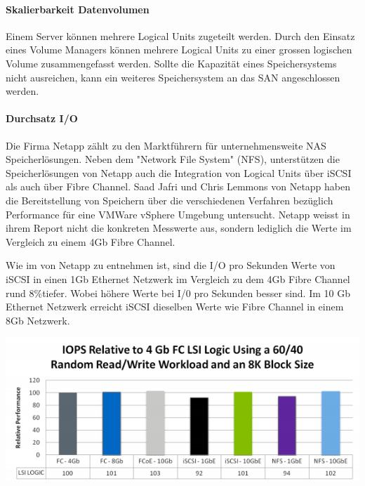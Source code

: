 \paragraph*{Skalierbarkeit Datenvolumen}
Einem Server können mehrere Logical Units zugeteilt werden. Durch den Einsatz eines Volume Managers können mehrere Logical Units zu einer grossen logischen Volume zusammengefasst werden. Sollte die Kapazität eines Speichersystems nicht ausreichen, kann ein weiteres Speichersystem an das SAN angeschlossen werden.

\paragraph*{Durchsatz I/O}
Die Firma Netapp zählt zu den Marktführern für unternehmensweite NAS Speicherlösungen. Neben dem "Network File System" (NFS), unterstützen die Speicherlösungen von Netapp auch die Integration von Logical Units über iSCSI als auch über Fibre Channel. Saad Jafri und Chris Lemmons von Netapp haben die Bereitstellung von Speichern über die verschiedenen Verfahren bezüglich Performance für eine VMWare vSphere Umgebung untersucht. Netapp weisst in ihrem Report nicht die konkreten Messwerte aus, sondern lediglich die Werte im Vergleich zu einem 4Gb Fibre Channel.

Wie im  von Netapp zu entnehmen ist, sind die I/O pro Sekunden Werte von iSCSI in einen 1Gb Ethernet Netzwerk im Vergleich zu dem 4Gb Fibre Channel rund 8\%tiefer. Wobei höhere Werte bei I/0 pro Sekunden besser sind. Im 10 Gb Ethernet Netzwerk erreicht iSCSI dieselben Werte wie Fibre Channel in einem 8Gb Netzwerk. \cite{Jafri2011}

\begin{center}
\includegraphics[width=\linewidth, keepaspectratio = true]{media/netapp_iops.png}
\end{center}

